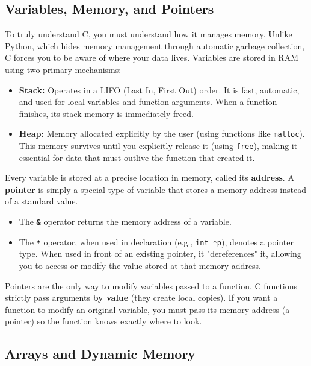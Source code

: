 

\subsection{Variables, Memory, and Pointers}

To truly understand C, you must understand how it manages memory. Unlike Python, which hides memory management through automatic garbage collection, C forces you to be aware of where your data lives. Variables are stored in RAM using two primary mechanisms:
\begin{itemize}
    \item[-] \textbf{Stack:} Operates in a LIFO (Last In, First Out) order. It is fast, automatic, and used for local variables and function arguments. When a function finishes, its stack memory is immediately freed.
    \item[-] \textbf{Heap:} Memory allocated explicitly by the user (using functions like \texttt{malloc}). This memory survives until you explicitly release it (using \texttt{free}), making it essential for data that must outlive the function that created it.
\end{itemize}

Every variable is stored at a precise location in memory, called its \textbf{address}. A \textbf{pointer} is simply a special type of variable that stores a memory address instead of a standard value.
\begin{itemize}
    \item[-] The \textbf{\texttt{\&}} operator returns the memory address of a variable.
    \item[-] The \textbf{\texttt{*}} operator, when used in declaration (e.g., \texttt{int *p}), denotes a pointer type. When used in front of an existing pointer, it "dereferences" it, allowing you to access or modify the value stored at that memory address.
\end{itemize}

Pointers are the only way to modify variables passed to a function. C functions strictly pass arguments \textbf{by value} (they create local copies). If you want a function to modify an original variable, you must pass its memory address (a pointer) so the function knows exactly where to look.



\subsection{Arrays and Dynamic Memory}

